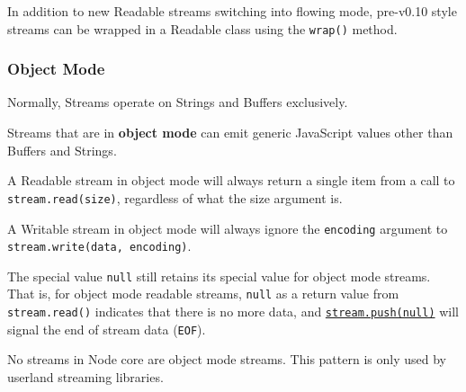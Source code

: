 \begin{Shaded}
\begin{Highlighting}[]
\NormalTok{(}

  \NormalTok{(}\NormalTok{, }\NormalTok{() \{}
    \NormalTok{(}\NormalTok{);}
  \NormalTok{\});}

  \NormalTok{();}

\NormalTok{(}\NormalTok{);}
\end{Highlighting}
\end{Shaded}

In addition to new Readable streams switching into flowing mode,
pre-v0.10 style streams can be wrapped in a Readable class using the
\texttt{wrap()} method.

\subsubsection{Object Mode}\label{object-mode}

Normally, Streams operate on Strings and Buffers exclusively.

Streams that are in \textbf{object mode} can emit generic JavaScript
values other than Buffers and Strings.

A Readable stream in object mode will always return a single item from a
call to \texttt{stream.read(size)}, regardless of what the size argument
is.

A Writable stream in object mode will always ignore the
\texttt{encoding} argument to \texttt{stream.write(data, encoding)}.

The special value \texttt{null} still retains its special value for
object mode streams. That is, for object mode readable streams,
\texttt{null} as a return value from \texttt{stream.read()} indicates
that there is no more data, and
\hyperref[streamux5freadableux5fpushux5fchunkux5fencoding]{\texttt{stream.push(null)}}
will signal the end of stream data (\texttt{EOF}).

No streams in Node core are object mode streams. This pattern is only
used by userland streaming libraries.

